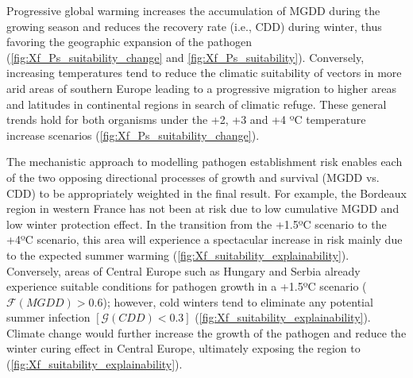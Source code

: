 Progressive global warming increases the accumulation of MGDD during the
growing season and reduces the recovery rate (i.e., CDD) during winter, thus
favoring the geographic expansion of the pathogen
(\cref{fig:Xf_Ps_suitability_change} and \cref{fig:Xf_Ps_suitability}).
Conversely, increasing temperatures tend to reduce the climatic suitability of
vectors in more arid areas of southern Europe leading to a progressive
migration to higher areas and latitudes in continental regions in search of
climatic refuge. These general trends hold for both organisms under the +2, +3
and +4 ºC temperature increase scenarios
(\cref{fig:Xf_Ps_suitability_change}).

The mechanistic approach to modelling pathogen establishment risk enables
each of the two opposing directional processes of growth and survival (MGDD vs.
CDD) to be appropriately weighted in the final result. For example, the
Bordeaux region in western France has not been at risk due to low cumulative
MGDD and low winter protection effect.	In the transition from the +1.5ºC
scenario to the +4ºC scenario, this area will experience a spectacular increase
in risk mainly due to the expected summer warming
(\cref{fig:Xf_suitability_explainability}). Conversely, areas of Central
Europe such as Hungary and Serbia already experience suitable conditions for
pathogen growth in a +1.5ºC scenario ($\mathcal{F}(MGDD) > 0.6$); however, cold
winters tend to eliminate any potential summer infection $[\mathcal{G}(CDD) <
            0.3]$ (\cref{fig:Xf_suitability_explainability}). Climate change
would further
increase the growth of the pathogen  and reduce the winter curing effect in
Central Europe, ultimately exposing the region to \xf{}
(\cref{fig:Xf_suitability_explainability}).

